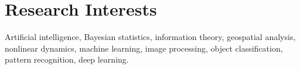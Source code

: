 \section{\sc Research Interests} %
Artificial intelligence, Bayesian statistics, information theory, geospatial analysis, nonlinear dynamics, machine learning, image processing, object classification, pattern recognition, deep learning.

